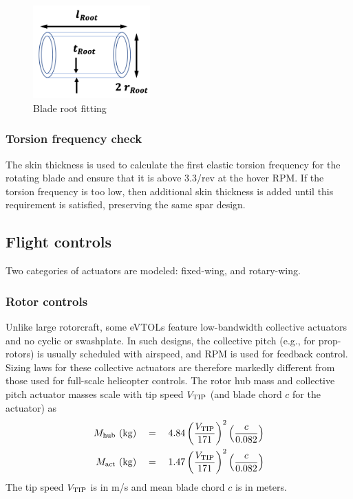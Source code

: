 \begin{figure}
\begin{center}
\includegraphics[width=0.4\textwidth]{images/root_fitting.png}
\vspace{-0.1cm}
\caption{Blade root fitting}
\label{fig:root_fitting}
\end{center}
\end{figure}

\subsubsection{Torsion frequency check}
The skin thickness is used to calculate the first elastic torsion frequency for the rotating blade and ensure that it is above 3.3/rev at the hover RPM. If the torsion frequency is too low, then additional skin thickness is added until this requirement is satisfied, preserving the same spar design.

\subsection{Flight controls}
\noindent Two categories of actuators are modeled: fixed-wing, and rotary-wing. 
\subsubsection{Rotor controls}
Unlike large rotorcraft, some eVTOLs feature low-bandwidth collective actuators and no cyclic or swashplate. In such designs, the collective pitch (e.g., for prop-rotors) is usually scheduled with airspeed, and RPM is used for feedback control. Sizing laws for these collective actuators are therefore markedly different from those used for full-scale helicopter controls. The rotor hub mass and collective pitch actuator masses scale with tip speed $V_{\rm TIP}$ (and blade chord $c$ for the actuator) as 
\begin{align}
M_{\rm hub} \textrm{ } ({\rm kg})\quad &= \quad 4.84 \left(\frac{V_{\rm TIP}}{171}\right)^2 \left(\frac{c}{0.082}\right) \\
M_{\rm act} \textrm{ } ({\rm kg})\quad &= \quad 1.47 \left(\frac{V_{\rm TIP}}{171}\right)^2 \left(\frac{c}{0.082}\right)
\end{align}
The tip speed $V_{\rm TIP}$ is in m/s and mean blade chord $c$ is in meters. 
